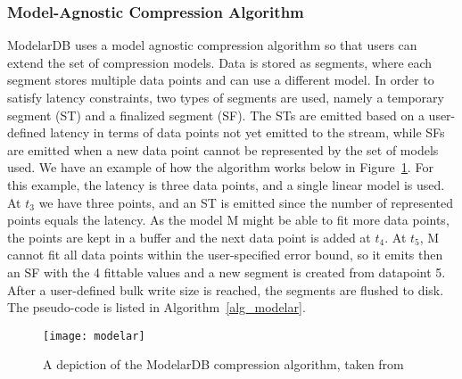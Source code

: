 \subsubsection{Model-Agnostic Compression Algorithm}
ModelarDB uses a model agnostic compression algorithm so that users can extend the set of
compression models. Data is stored as segments, where each segment stores multiple data
points and can use a different model. In order to satisfy latency constraints, two types
of segments are used, namely a temporary segment (ST) and a finalized segment (SF).
The STs are emitted based on a user-defined latency in terms of data points not yet
emitted to the stream, while SFs are emitted when a new data point cannot be represented
by the set of models used.
We have an example of how the algorithm works below in Figure~\ref{modelar}. For this example,
the latency is three data points, and a single linear model is used. At $t_3$  we have three
points, and an ST is emitted since the number of represented points equals the latency.
As the model M might be able to fit more data points, the points are kept in a buffer and
the next data point is added at $t_4$. At $t_5$, M cannot fit all data points within the
user-specified error bound, so it emits then an SF with the 4 fittable values and a
new segment is created from datapoint 5. After a user-defined bulk write size is
reached,  the segments are flushed to disk.
The pseudo-code is listed in Algorithm~\ref{alg_modelar}.
\begin{figure}
\begin{center}
\texttt{[image: modelar]}
\caption[modelar]{A depiction of the ModelarDB compression algorithm, taken from \cite{jensen_2018_modelardb}}
\label{modelar}
\end{center}
\end{figure}
